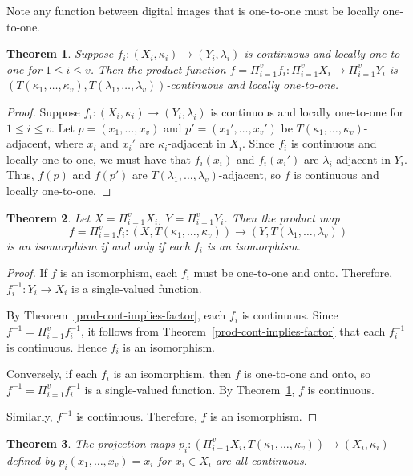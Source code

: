 \documentclass{article}
\theoremstyle{plain}
\newtheorem{thm}{Theorem}
\theoremstyle{definition}
\numberwithin{thm}{section}
\begin{document}
Note any function between digital images that is one-to-one must be locally one-to-one.

\begin{thm}
\label{T-prod-continuity}
Suppose $f_i: (X_i, \kappa_i) \to (Y_i,\lambda_i)$ is continuous and locally
one-to-one for $1 \le i \le v$. Then the product function
$f=\Pi_{i=1}^v f_i: \Pi_{i=1}^v X_i \to \Pi_{i=1}^v Y_i$ is $(T(\kappa_1,\ldots, \kappa_v), T(\lambda_1,\ldots,\lambda_v))$-continuous and locally one-to-one.
\end{thm}

\begin{proof}
Suppose $f_i: (X_i, \kappa_i) \to (Y_i,\lambda_i)$ is continuous and 
locally one-to-one for $1 \le i \le v$. Let $p=(x_1,\ldots, x_v)$
and $p'=(x_1',\ldots, x_v')$ be
$T(\kappa_1,\ldots, \kappa_v)$-adjacent,
where $x_i$ and $x_i'$ are
$\kappa_i$-adjacent in $X_i$. Since
$f_i$ is continuous and locally one-to-one,
we must have that $f_i(x_i)$ and $f_i(x_i')$
are $\lambda_i$-adjacent in $Y_i$. Thus,
$f(p)$ and $f(p')$ are
$T(\lambda_1,\ldots,\lambda_v)$-adjacent, so
$f$ is continuous and locally one-to-one.
\end{proof}

\begin{thm}
\label{T-prod-cont}
Let $X=\Pi_{i=1}^v X_i$, $Y=\Pi_{i=1}^v Y_i$.
Then the product map
\[ f=\Pi_{i=1}^v f_i: (X, T(\kappa_1,\ldots,\kappa_v)) \to (Y, T(\lambda_1, \ldots, \lambda_v)) \]
is an isomorphism if and only if each
$f_i$ is an isomorphism.
\end{thm}

\begin{proof}
If $f$ is an isomorphism, each $f_i$ must
be one-to-one and onto. Therefore,
$f_i^{-1}: Y_i \to X_i$ is a single-valued
function.

By Theorem~\ref{prod-cont-implies-factor}, each $f_i$ is continuous. Since
$f^{-1}=\Pi_{i=1}^v f_i^{-1}$, it follows
from Theorem~\ref{prod-cont-implies-factor}
that each $f_i^{-1}$ is continuous. Hence
$f_i$ is an isomorphism.

Conversely, if each $f_i$ is an isomorphism,
then $f$ is one-to-one and onto, so
$f^{-1}=\Pi_{i=1}^v f_i^{-1}$ is a
single-valued function. By Theorem~\ref{T-prod-continuity}, $f$ is continuous.

Similarly, $f^{-1}$ is continuous.
Therefore, $f$ is an isomorphism.
\end{proof}

\begin{thm}
\label{T-projection-cont}
The projection maps
$p_i: (\Pi_{i=1}^v X_i, T(\kappa_1, \ldots, \kappa_v)) \to (X_i, \kappa_i)$
defined by $p_i(x_1, \ldots, x_v) = x_i$
for $x_i \in X_i$ are all continuous.
\end{thm}
\end{document}
